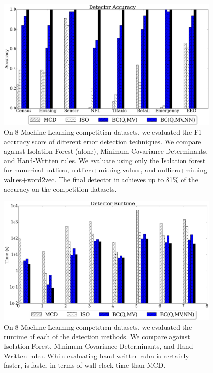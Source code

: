 \begin{figure}[t]
\centering
 \includegraphics[width=\columnwidth]{exp/daccuracy.png}
 \caption{On 8 Machine Learning competition datasets, we evaluated the F1 accuracy score of different error detection techniques. We compare against Isolation Forest (alone), Minimum Covariance Determinants, and Hand-Written rules. We evaluate \sys using only the Isolation forest for numerical outliers, outliers+missing values, and outliers+missing values+word2vec.
 The final detector in \sys achieves up to 81\% of the accuracy on the competition datasets.
 \label{fig:derror}}
\end{figure}

\begin{figure}[t]
\centering
 \includegraphics[width=\columnwidth]{exp/druntime.png}
 \caption{On 8 Machine Learning competition datasets, we evaluated the runtime of each of the detection methods. We compare against Isolation Forest, Minimum Covariance Determinants, and Hand-Written rules. While evaluating hand-written rules is certainly faster, \sys is faster in terms of wall-clock time than MCD.
 \label{fig:druntime}}
\end{figure}

